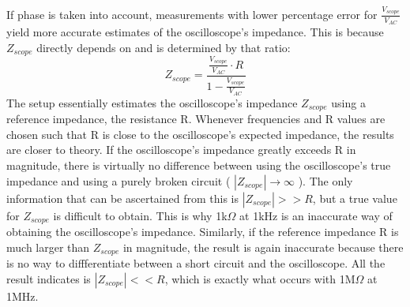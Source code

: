 If phase is taken into account, measurements with lower percentage error for $\frac{V_{scope}}{V_{AC}}$ yield more accurate estimates of the oscilloscope's impedance. This is because $Z_{scope}$ directly depends on and is determined by that ratio:
\begin{equation}
\label{eq:zscope}
Z_{scope} = \frac{\frac{V_{scope}}{V_{AC}} \cdot R }{1 - \frac{V_{scope}}{V_{AC}}}
\end{equation}
The setup essentially estimates the oscilloscope's impedance $Z_{scope}$ using a reference impedance, the resistance R. Whenever frequencies and R values are chosen such that R is close to the oscilloscope's expected impedance, the results are closer to theory. If the oscilloscope's impedance greatly exceeds R in magnitude, there is virtually no difference between using the oscilloscope's true impedance and using a purely broken circuit ( $|Z_{scope}| \rightarrow \infty$ ). The only information that can be ascertained from this is $|Z_{scope}| >> R$, but a true value for $Z_{scope}$ is difficult to obtain. This is why 1k$\Omega$ at 1kHz is an inaccurate way of obtaining the oscilloscope's impedance.
Similarly, if the reference impedance R is much larger than $Z_{scope}$ in magnitude, the result is again inaccurate because there is no way to diffferentiate between a short circuit and the oscilloscope. All the result indicates is $|Z_{scope}| << R$, which is exactly what occurs with 1M$\Omega$ at 1MHz.
